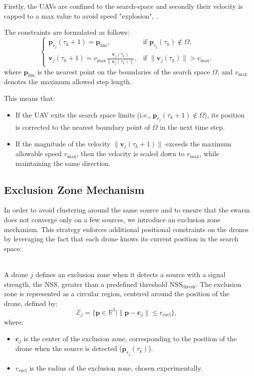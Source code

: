 Firstly, the UAVs are confined to the 
search-space and secondly their velocity is 
capped to a max value to avoid speed "explosion", \cite{3}.

The constraints are formulated as follows:
\[
\begin{cases}
    \mathbf{p}_{r_j}(\tau_k + 1) = \mathbf{p}_\text{lim}, & \text{if } \mathbf{p}_{r_j}(\tau_k) \notin \Omega, \\
    \mathbf{v}_j(\tau_k + 1) = v_{\text{max}} \frac{\mathbf{v}_j(\tau_k)}{\|\mathbf{v}_j(\tau_k)\|}, & \text{if } \|\mathbf{v}_j(\tau_k)\| > v_{\text{max}}.
\end{cases}
\]
where \( \mathbf{p}_\text{lim} \) is the nearest point on the boundaries of the search space \( \Omega \), 
and \( v_{\text{max}} \) denotes the maximum allowed step length.

\noindent
This means that:
\begin{itemize}
    \item If the UAV exits the search space limits (i.e., \( \mathbf{p}_{r_j}(\tau_k+1) \notin \Omega \)), 
    its position is corrected to the nearest boundary point of \( \Omega \) 
    in the next time step.
    \item If the magnitude of the velocity \( \|\mathbf{v}_j(\tau_k + 1)\| \) 
    exceeds the maximum allowable speed \( v_{\text{max}} \), 
    then the velocity is scaled down to \( v_{\text{max}} \), 
    while maintaining the same direction.
\end{itemize}

\subsection{Exclusion Zone Mechanism}
In order to avoid clustering around the same source 
and to ensure that the swarm does not converge only 
on a few sources, we introduce an exclusion zone mechanism. 
This strategy enforces additional positional constraints 
on the drones by leveraging the fact that each drone 
knows its current position in the search space.

\noindent
\\
A drone \( j \) defines an exclusion zone when it detects a source 
with a signal strength, the NSS, greater than a predefined threshold 
\( \text{NSS}_{\text{thresh}} \). The exclusion zone is represented 
as a circular region, centered around the position of the drone, defined by:
\[
\mathcal{E}_j = \{ \mathbf{p} \in \mathbb{R}^3 \mid \|\mathbf{p} - \mathbf{c}_j\| 
\leq r_{\text{excl}} \},
\]
where:
\begin{itemize}
    \item \( \mathbf{c}_j \) is the center of the exclusion zone, 
    corresponding to the position of the drone when the source 
    is detected (\( \mathbf{p}_{r_j}(\tau_k) \)).
    \item \( r_{\text{excl}} \) is the radius of the exclusion zone, 
    chosen experimentally.
\end{itemize}

